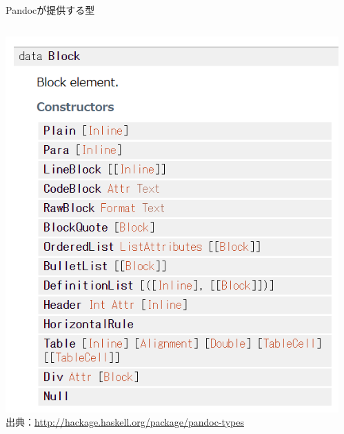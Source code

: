 \documentclass[14pt,dvipdfmx,uplatex]{beamer}
\begin{document}
\begin{frame}[t]{\inhibitglue Pandocが提供する型}
  \sffamily
  \begin{center}
    \begin{columns}[c]
      \begin{column}{.5\textwidth}
      \includegraphics[width=\textwidth]{figures/pandoc-type-block.png}\\
      \hbox{\tiny 出典：\url{http://hackage.haskell.org/package/pandoc-types} }
      \end{column}
      \begin{column}{.3\textwidth}

\end{column}
\end{columns}
\end{center}
\end{frame}
\end{document}
